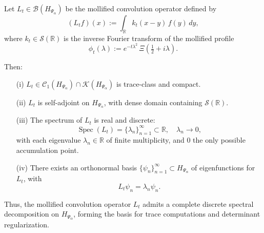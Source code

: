 \begin{proposition}
\label{prop:spectrum-Lt-real-discrete}
Let \( L_t \in \mathcal{B}(H_{\Psi_\alpha}) \) be the mollified convolution operator defined by
\[
(L_t f)(x) := \int_{\mathbb{R}} k_t(x - y)\, f(y)\, dy,
\]
where \( k_t \in \mathcal{S}(\mathbb{R}) \) is the inverse Fourier transform of the mollified profile
\[
\phi_t(\lambda) := e^{-t\lambda^2} \, \Xi\left( \tfrac{1}{2} + i\lambda \right).
\]

Then:
\begin{enumerate}
    \item[\textnormal{(i)}] \( L_t \in \mathcal{C}_1(H_{\Psi_\alpha}) \cap \mathcal{K}(H_{\Psi_\alpha}) \) is trace-class and compact.

    \item[\textnormal{(ii)}] \( L_t \) is self-adjoint on \( H_{\Psi_\alpha} \), with dense domain containing \( \mathcal{S}(\mathbb{R}) \).

    \item[\textnormal{(iii)}] The spectrum of \( L_t \) is real and discrete:
    \[
    \operatorname{Spec}(L_t) = \{ \lambda_n \}_{n=1}^\infty \subset \mathbb{R}, \quad \lambda_n \to 0,
    \]
    with each eigenvalue \( \lambda_n \in \mathbb{R} \) of finite multiplicity, and \( 0 \) the only possible accumulation point.

    \item[\textnormal{(iv)}] There exists an orthonormal basis \( \{ \psi_n \}_{n=1}^\infty \subset H_{\Psi_\alpha} \) of eigenfunctions for \( L_t \), with
    \[
    L_t \psi_n = \lambda_n \psi_n.
    \]
\end{enumerate}

\noindent
Thus, the mollified convolution operator \( L_t \) admits a complete discrete spectral decomposition on \( H_{\Psi_\alpha} \), forming the basis for trace computations and determinant regularization.
\end{proposition}
% 